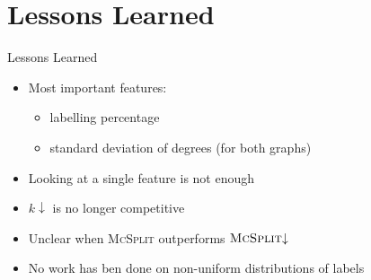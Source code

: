 \documentclass{beamer}
\begin{document}

\section{Lessons Learned}

\begin{frame}{Lessons Learned}
  \begin{itemize}
  \item Most important features:
    \begin{itemize}
    \item labelling percentage
    \item standard deviation of degrees (for both graphs)
    \end{itemize}
  \item Looking at a single feature is not enough
    \pause
  \item $k{\downarrow}$ is no longer competitive
  \item Unclear when \textsc{McSplit} outperforms $\textsc{McSplit}{\downarrow}$
    \pause
  \item No work has ben done on non-uniform distributions of labels
  \end{itemize}
\end{frame}
\end{document}
